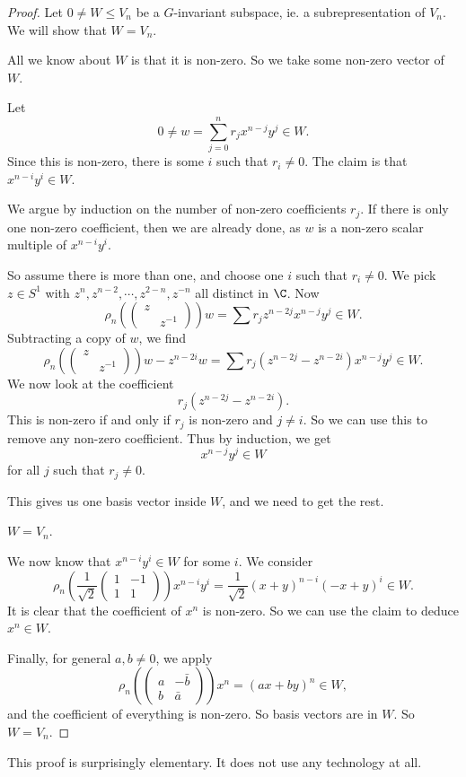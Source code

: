\documentclass[a4paper]{article}
\begin{document}
\begin{proof}
  Let $0 \not= W \leq V_n$ be a $G$-invariant subspace, ie. a subrepresentation of $V_n$. We will show that $W = V_n$.

  All we know about $W$ is that it is non-zero. So we take some non-zero vector of $W$.
  \begin{claim}
    Let
    \[
      0 \not= w = \sum_{j = 0}^n r_j x^{n - j}y^j \in W.
    \]
    Since this is non-zero, there is some $i$ such that $r_i \not= 0$. The claim is that $x^{n - i}y^i \in W$.
  \end{claim}
  We argue by induction on the number of non-zero coefficients $r_j$. If there is only one non-zero coefficient, then we are already done, as $w$ is a non-zero scalar multiple of $x^{n - i}y^i$.

  So assume there is more than one, and choose one $i$ such that $r_i \not= 0$. We pick $z \in S^1$ with $z^n, z^{n - 2}, \cdots, z^{2 - n}, z^{-n}$ all distinct in $\C$. Now
  \[
    \rho_n\left(
    \begin{pmatrix}
      z\\&z^{-1}
    \end{pmatrix}\right)w = \sum r_j z^{n - 2j} x^{n - j}y^j \in W.
  \]
  Subtracting a copy of $w$, we find
  \[
    \rho_n\left(
    \begin{pmatrix}
      z\\&z^{-1}
    \end{pmatrix}\right)w - z^{n - 2i}w = \sum r_j (z^{n - 2j} - z^{n - 2i})x^{n - j}y^j \in W.
  \]
  We now look at the coefficient
  \[
    r_j (z^{n - 2j} - z^{n - 2i}).
  \]
  This is non-zero if and only if $r_j$ is non-zero and $j \not= i$. So we can use this to remove any non-zero coefficient. Thus by induction, we get
  \[
    x^{n - j}y^j \in W
  \]
  for all $j$ such that $r_j \not= 0$.

  This gives us one basis vector inside $W$, and we need to get the rest.

  \begin{claim}
    $W = V_n$.
  \end{claim}
  We now know that $x^{n - i}y^i \in W$ for some $i$. We consider
  \[
    \rho_n\left(\frac{1}{\sqrt{2}}
    \begin{pmatrix}
      1 & -1\\
      1 & 1
    \end{pmatrix}\right) x^{n - i}y^i = \frac{1}{\sqrt{2}} (x + y)^{n - i}(-x + y)^i \in W.
  \]
  It is clear that the coefficient of $x^n$ is non-zero. So we can use the claim to deduce $x^n \in W$.

  Finally, for general $a, b \not= 0$, we apply
  \[
    \rho_n\left(
    \begin{pmatrix}
      a & -\bar{b}\\
      b &\bar{a}
    \end{pmatrix}\right) x^n = (ax + by)^n \in W,
  \]
  and the coefficient of everything is non-zero. So basis vectors are in $W$. So $W = V_n$.
\end{proof}
This proof is surprisingly elementary. It does not use any technology at all.
\end{document}
